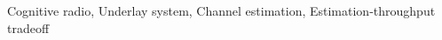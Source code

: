 \begin{abstract}
\end{abstract}
\vspace{\keymara}
\begin{IEEEkeywords}
\vspace{\keymarb}
Cognitive radio, Underlay system, Channel estimation, Estimation-throughput tradeoff 
\end{IEEEkeywords}

